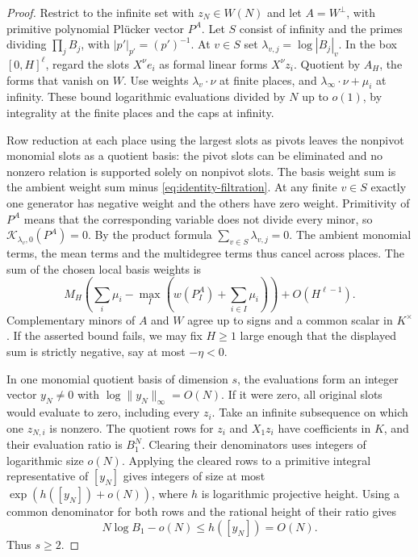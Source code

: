 \documentclass[11pt,a4paper,reqno]{amsart}
\theoremstyle{definition}
\theoremstyle{remark}
\numberwithin{equation}{section}
\begin{document}
\begin{proof}
Restrict to the infinite set with \(z_N\in W(N)\) and let
\(A=W^\perp\), with primitive polynomial Pl\"ucker vector
\(P^A\). Let \(S\) consist of infinity and the primes dividing
\(\prod_j B_j\), with \(|p'|_{p'}=(p')^{-1}\). At \(v\in S\) set
\(\lambda_{v,j}=\log|B_j|_v\). In the box \([0,H]^\ell\),
regard the slots \(X^\nu e_i\) as formal linear forms
\(X^\nu z_i\). Quotient by \(A_H\), the forms that vanish
on \(W\). Use weights \(\lambda_v\cdot\nu\) at finite
places, and \(\lambda_\infty\cdot\nu+\mu_i\) at infinity.
These bound logarithmic evaluations divided by \(N\) up to
\(o(1)\), by integrality at the finite places and the caps
at infinity.

Row reduction at each place using the largest slots as pivots
leaves the nonpivot monomial slots as a quotient basis: the
pivot slots can be eliminated and no nonzero relation
is supported solely on nonpivot slots. The basis weight
sum is the ambient weight sum minus \eqref{eq:identity-filtration}.
At any finite \(v\in S\) exactly one generator has negative
weight and the others have zero weight. Primitivity of \(P^A\)
means that the corresponding variable does not divide every
minor, so \(\mathcal K_{\lambda_v,0}(P^A)=0\).
By the product formula \(\sum_{v\in S}\lambda_{v,j}=0\).
The ambient monomial terms, the mean terms and the multidegree
terms thus cancel across places. The sum of the chosen local
basis weights is
\[
   M_H\left(\sum_i\mu_i-
             \max_{I}\left(w(P^A_I)+\sum_{i\in I}\mu_i\right)\right)
       +O(H^{\ell-1}).
\]
Complementary minors of \(A\) and \(W\) agree up to signs
and a common scalar in \(K^\times\). If the asserted bound
fails, we may fix \(H\ge1\) large enough that the displayed
sum is strictly negative, say at most \(-\eta<0\).

In one monomial quotient basis of dimension \(s\), the
evaluations form an integer vector \(y_N\ne0\) with
\(\log\|y_N\|_\infty=O(N)\). If it were zero, all original
slots would evaluate to zero, including every \(z_i\).
Take an infinite subsequence on which one \(z_{N,i}\)
is nonzero. The quotient rows for \(z_i\) and \(X_1z_i\)
have coefficients in \(K\), and their evaluation ratio is
\(B_1^N\). Clearing their denominators uses integers of
logarithmic size \(o(N)\). Applying the cleared rows to a
primitive integral representative of \([y_N]\) gives
integers of size at most \(\exp(h([y_N])+o(N))\), where \(h\)
is logarithmic projective height. Using a common denominator
for both rows and the rational height of their ratio gives
\[
             N\log B_1-o(N)\le h([y_N])=O(N).
\]
Thus \(s\ge2\).


\end{proof}
\end{document}
